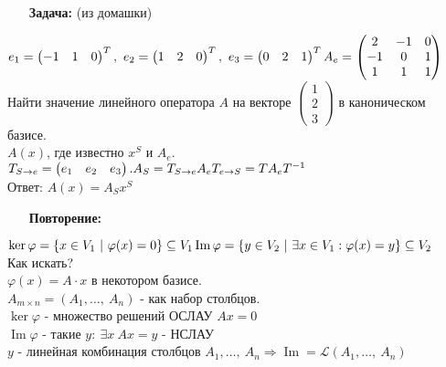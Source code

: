 \documentclass[12pt, letterpaper, twoside]{article}
\begin{document}
    \begin{enumerate}
        \item[\textbf{Задача:}] (из домашки)
    \end{enumerate}
    $e_1 = \begin{pmatrix}
        -1 & 1 & 0
    \end{pmatrix}^T,\ e_2 = \begin{pmatrix}
        1 & 2 & 0
    \end{pmatrix}^T,\ e_3 = \begin{pmatrix}
        0 & 2 & 1
    \end{pmatrix}^T\\
    A_e = \begin{pmatrix}
        2 & -1 & 0\\
        -1 & 0 & 1\\
         1 & 1 & 1
    \end{pmatrix}$\\
    Найти значение линейного оператора $A$ на векторе $\begin{pmatrix}
        1\\
        2\\
        3
    \end{pmatrix}$ в каноническом базисе.\\
    $A(x)$, где известно $x^S$ и $A_e$. $T_{S\rightarrow e} = \begin{pmatrix}
        e_1 & e_2 & e_3
    \end{pmatrix}.\\
    A_S = T_{S\rightarrow e} A_e T_{e\rightarrow S} = TA_e T^{-1}$\\
    Ответ: $A(x) = A_S x^S$
    \begin{enumerate}
        \item[\textbf{Повторение:}]
    \end{enumerate}
    $\ker \varphi = \{x\in V_1\ |\ \varphi(x) = 0\}\subseteq V_1\\
    \operatorname{Im} \varphi = \{y \in V_2\ |\ \exists x\in V_1: \varphi(x) = y \}\subseteq V_2$\\
    Как искать?\\
    $\varphi(x) = A\cdot x$ в некотором базисе.\\
    $A_{m\times n} = (A_1,\dots,\ A_n)$ - как набор столбцов.\\
    $\ker \varphi$ - множество решений ОСЛАУ $Ax = 0$\\
    $\operatorname{Im}\varphi$ - такие $y:\ \exists x\ Ax = y$ - НСЛАУ\\
    $y$ - линейная комбинация столбцов $A_1,\dots,\ A_n\Rightarrow \operatorname{Im} = \mathcal{L}(A_1,\dots,\ A_n)$
\end{document}
